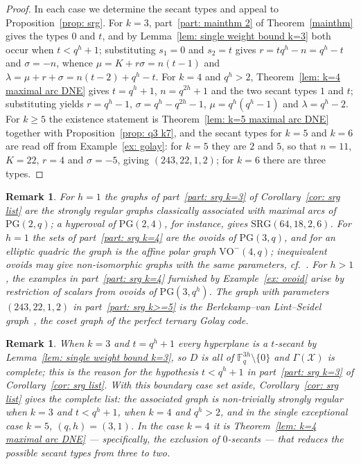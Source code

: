 \documentclass[12pt, twoside]{article}
\newtheorem{remark}[theorem]{\bf Remark}
\begin{document}
	\begin{proof}
		In each case we determine the secant types and appeal to Proposition~\ref{prop: srg}. For $k=3$, part~\ref{part: mainthm 2} of Theorem~\ref{mainthm} gives the types $0$ and $t$, and by Lemma~\ref{lem: single weight bound k=3} both occur when $t<q^h+1$; substituting $s_1=0$ and $s_2=t$ gives $r=tq^h-n=q^h-t$ and $\sigma=-n$, whence $\mu=K+r\sigma=n(t-1)$ and $\lambda=\mu+r+\sigma=n(t-2)+q^h-t$. For $k=4$ and $q^h>2$, Theorem~\ref{lem: k=4 maximal arc DNE} gives $t=q^h+1$, $n=q^{2h}+1$ and the two secant types $1$ and $t$; substituting yields $r=q^h-1$, $\sigma=q^h-q^{2h}-1$, $\mu=q^h(q^h-1)$ and $\lambda=q^h-2$. For $k\ge5$ the existence statement is Theorem~\ref{lem: k=5 maximal arc DNE} together with Proposition~\ref{prop: q3 k7}, and the secant types for $k=5$ and $k=6$ are read off from Example~\ref{ex: golay}: for $k=5$ they are $2$ and $5$, so that $n=11$, $K=22$, $r=4$ and $\sigma=-5$, giving $(243,22,1,2)$; for $k=6$ there are three types.
	\end{proof}

\begin{remark}\label{rem: srg identification}
		For $h=1$ the graphs of part~\ref{part: srg k=3} of Corollary~\ref{cor: srg list} are the strongly regular graphs classically associated with maximal arcs of $\mathrm{PG}(2,q)$; a hyperoval of $\mathrm{PG}(2,4)$, for instance, gives $\mathrm{SRG}(64,18,2,6)$. For $h=1$ the sets of part~\ref{part: srg k=4} are the ovoids of $\mathrm{PG}(3,q)$, and for an elliptic quadric the graph is the affine polar graph $\mathrm{VO}^-(4,q)$; inequivalent ovoids may give non-isomorphic graphs with the same parameters, cf.~\cite{CK}. For $h>1$, the examples in part~\ref{part: srg k=4} furnished by Example~\ref{ex: ovoid} arise by restriction of scalars from ovoids of $\mathrm{PG}(3,q^h)$. The graph with parameters $(243,22,1,2)$ in part~\ref{part: srg k>=5} is the Berlekamp--van Lint--Seidel graph~\cite{BvLS}, the coset graph of the perfect ternary Golay code.
	\end{remark}

	\begin{remark}
		When $k=3$ and $t=q^h+1$ every hyperplane is a $t$-secant by Lemma~\ref{lem: single weight bound k=3}, so $D$ is all of $\mathbb{F}_q^{3h}\setminus\{0\}$ and $\Gamma(\mathcal{X})$ is complete; this is the reason for the hypothesis $t<q^h+1$ in part~\ref{part: srg k=3} of Corollary~\ref{cor: srg list}. With this boundary case set aside, Corollary~\ref{cor: srg list} gives the complete list: the associated graph is non-trivially strongly regular when $k=3$ and $t<q^h+1$, when $k=4$ and $q^h>2$, and in the single exceptional case $k=5$, $(q,h)=(3,1)$. In the case $k=4$ it is Theorem~\ref{lem: k=4 maximal arc DNE} --- specifically, the exclusion of $0$-secants --- that reduces the possible secant types from three to two.
	\end{remark}
\end{document}
